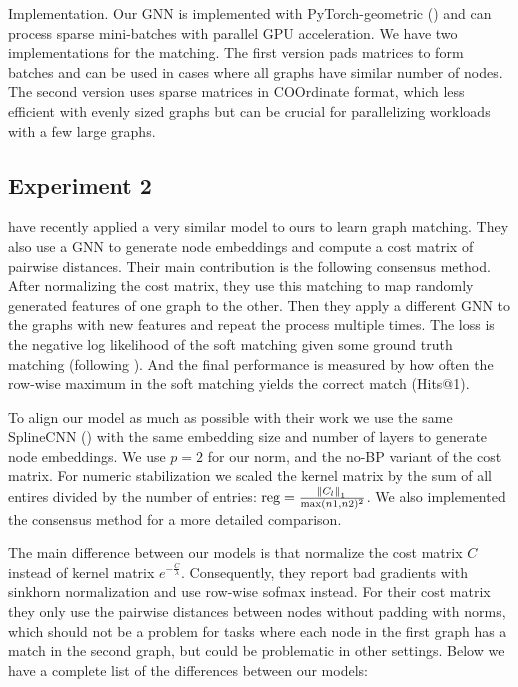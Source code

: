 Implementation. Our GNN is implemented with PyTorch-geometric (\citealp{pytorchgeometric}) and can process sparse mini-batches with parallel GPU acceleration. We have two implementations for the matching. The first version pads matrices to form batches and can be used in cases where all graphs have similar number of nodes. The second version uses sparse matrices in COOrdinate format, which less efficient with evenly sized graphs but can be crucial for parallelizing workloads with a few large graphs.

\subsection{Experiment 2}

\cite{fey2020_update} have recently applied a very similar model to ours to learn graph matching. They also use a GNN to generate node embeddings and compute a cost matrix of pairwise distances. Their main contribution is the following consensus method. After normalizing the cost matrix, they use this matching to map randomly generated features of one graph to the other. Then they apply a different GNN to the graphs with new features and repeat the process multiple times. The loss is the negative log likelihood of the soft matching given some ground truth matching (following \citealp{wang2019}). And the final performance is measured by how often the row-wise maximum in the soft matching yields the correct match (Hits@1).

To align our model as much as possible with their work we use the same SplineCNN (\citealp{spline2018}) with the same embedding size and number of layers to generate node embeddings. We use $p=2$ for our norm, and the no-BP variant of the cost matrix. For numeric stabilization we scaled the kernel matrix by the sum of all entires divided by the number of entries: $\text{reg} = \frac{\norm{C_l}_1}{\max(n1,n2)^2}$. We also implemented the consensus method for a more detailed comparison.

The main difference between our models is that \cite{fey2020_update} normalize the cost matrix $C$ instead of kernel matrix $e^{-\frac{C}{\lambda}}$. Consequently, they report bad gradients with sinkhorn normalization and use row-wise sofmax instead. For their cost matrix they only use the pairwise distances between nodes without padding with norms, which should not be a problem for tasks where each node in the first graph has a match in the second graph, but could be problematic in other settings. Below we have a complete list of the differences between our models:

